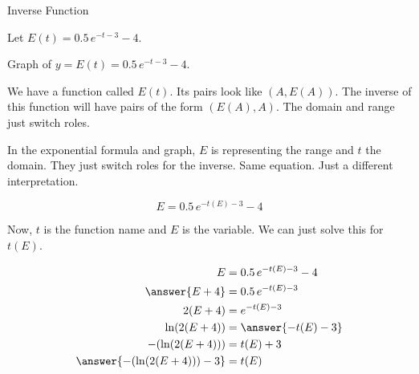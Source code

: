 \documentclass{ximera}
\begin{document}
\begin{example} Inverse Function

Let $E(t) = 0.5 \, e^{-t-3} - 4$.




Graph of $y = E(t) = 0.5 \, e^{-t-3} - 4$.


\begin{image}
\end{image}




We have a function called $E(t)$.  Its pairs look like $(A, E(A))$.  The inverse of this function will have pairs of the form $(E(A), A)$. The domain and range just switch roles.


In the exponential formula and graph, $E$ is representing the range and $t$ the domain.  They just switch roles for the inverse. Same equation.  Just a different interpretation.

\[    E = 0.5 \, e^{-t(E)-3} - 4   \]


Now, $t$ is the function name and $E$ is the variable.  We can just solve this for $t(E)$.

\begin{align*}
E           & = 0.5 \, e^{-t(E)-3} - 4 \\
\answer{E + 4}       & = 0.5 \, e^{-t(E)-3}  \\
2(E + 4)    & =  e^{-t(E)-3}   \\
\ln(2(E+4))  & = \answer{-t(E)-3}   \\
-(\ln(2(E+4)))  & = t(E)+3   \\
\answer{-(\ln(2(E+4))) - 3}   & = t(E)
\end{align*}








\end{example}
\end{document}
